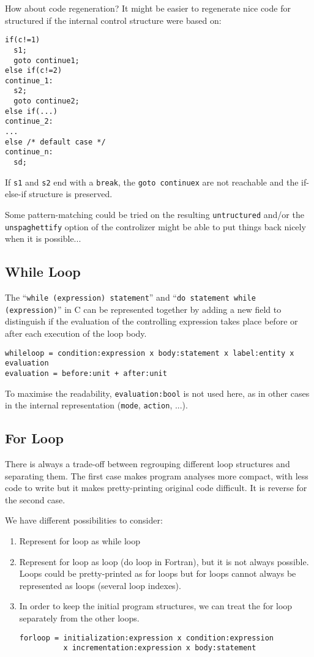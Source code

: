 \documentclass[a4paper]{report}
\begin{document}
How about code regeneration? It might be easier to regenerate nice
code for structured if the internal control structure were based on:

\begin{lstlisting}
if(c!=1) 
  s1;
  goto continue1;
else if(c!=2)
continue_1:
  s2;
  goto continue2;
else if(...)
continue_2:
...
else /* default case */
continue_n:
  sd;
\end{lstlisting}

If \verb/s1/ and \verb/s2/ end with a \verb/break/, the
\verb/goto continuex/ are not reachable and the if-else-if structure
is preserved.

Some pattern-matching could be tried on the resulting
\verb/untructured/ and/or the \verb/unspaghettify/ option of the
controlizer might be able to put things back nicely when it is
possible...

\subsection{While Loop}

The ``\lstinline/while (expression) statement/'' and 
``\lstinline/do statement while (expression)/'' in C can be represented together
 by adding a new field to distinguish
if the evaluation of the
controlling expression takes place before or after each execution of the
loop body.   

\begin{verbatim}
whileloop = condition:expression x body:statement x label:entity x evaluation
evaluation = before:unit + after:unit
\end{verbatim}
To maximise the readability, \verb|evaluation:bool| is not used here,
as in other cases in the internal representation (\verb/mode/,
\verb/action/, ...).

\subsection{For Loop}

There is always a trade-off between regrouping different loop structures
and separating them. The first case makes program analyses more compact,
with less code to write but it makes pretty-printing original code
difficult. It is reverse for the second case. 

We have different possibilities to consider:
\begin{enumerate}
\item Represent for loop as while loop
\item Represent for loop as loop (do loop in Fortran), but it is not always
  possible. Loops could be pretty-printed as for loops but for loops cannot
  always be represented as loops (several loop indexes).
\item In order to keep the initial program structures, we can treat the for loop
separately from the other loops. 

\begin{verbatim}
forloop = initialization:expression x condition:expression
          x incrementation:expression x body:statement
\end{verbatim}
\end{enumerate}
\end{document}
